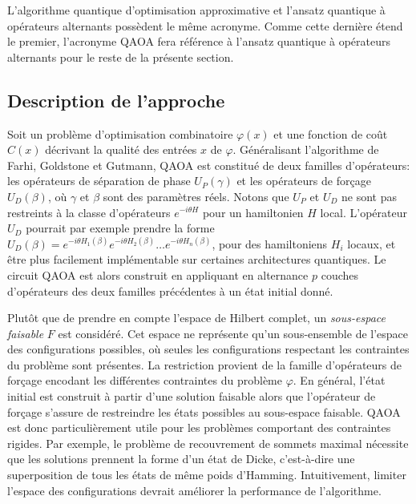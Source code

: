 L'algorithme quantique d'optimisation approximative et l'ansatz quantique à opérateurs alternants possèdent le même acronyme. Comme cette dernière étend le premier, l'acronyme QAOA fera référence à l'ansatz quantique à opérateurs alternants pour le reste de la présente section.


\subsection{Description de l'approche}

Soit un problème d'optimisation combinatoire $\varphi(x)$ et une fonction de coût $C(x)$ décrivant la qualité des entrées $x$ de $\varphi$. Généralisant l'algorithme de Farhi, Goldstone et Gutmann, QAOA est constitué de deux familles d'opérateurs: les opérateurs de séparation de phase $U_{P}(\gamma)$ et les opérateurs de forçage $U_{D}(\beta)$, où $\gamma$ et $\beta$ sont des paramètres réels. Notons que $U_{P}$ et $U_{D}$ ne sont pas restreints à la classe d'opérateurs $e^{-i \theta H}$ pour un hamiltonien $H$ local. L'opérateur $U_{D}$ pourrait par exemple prendre la forme $U_{D}(\beta)=e^{-i \theta H_{1}(\beta)} e^{-i \theta H_{2}(\beta)} \dots e^{-i \theta H_{n}(\beta)}$, pour des hamiltoniens $H_{i}$ locaux, et être plus facilement implémentable sur certaines architectures quantiques. Le circuit QAOA est alors construit en appliquant en alternance $p$ couches d'opérateurs des deux familles précédentes à un état initial donné.
        
Plutôt que de prendre en compte l'espace de Hilbert complet, un \textit{sous-espace faisable} $F$ est considéré. Cet espace ne représente qu'un sous-ensemble de l'espace des configurations possibles, où seules les configurations respectant les contraintes du problème sont présentes. La restriction provient de la famille d'opérateurs de forçage encodant les différentes contraintes du problème $\varphi$. En général, l'état initial est construit à partir d'une solution faisable alors que l'opérateur de forçage s'assure de restreindre les états possibles au sous-espace faisable. QAOA est donc particulièrement utile pour les problèmes comportant des contraintes rigides. Par exemple, le problème de recouvrement de sommets maximal nécessite que les solutions prennent la forme d'un état de Dicke, c'est-à-dire une superposition de tous les états de même poids d'Hamming. Intuitivement, limiter l'espace des configurations devrait améliorer la performance de l'algorithme. 

